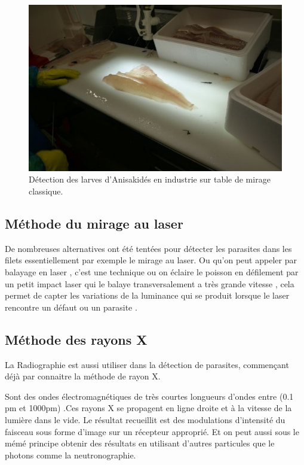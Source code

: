 \documentclass[12pt,a4paper]{article}
\begin{document}
\begin{figure}[!h]
   \center
   \includegraphics[scale=0.5]{Table_mirage.png}
   \caption {Détection des larves d'Anisakidés en industrie sur table de mirage classique.}
\end{figure}

\subsection{Méthode du mirage au laser}

De nombreuses alternatives ont été tentées pour détecter les parasites dans les filets essentiellement  par exemple le mirage au laser.
Ou qu’on peut appeler par balayage en laser , c’est une technique ou on éclaire le poisson en défilement par un petit impact laser  qui le balaye transversalement a très grande vitesse , cela permet de capter les variations de la luminance qui se produit lorsque le laser rencontre un défaut ou un parasite .
\subsection{Méthode des rayons X}
La Radiographie est aussi utiliser dans la détection de parasites, commençant déjà par connaitre la méthode de rayon X.

Sont des ondes électromagnétiques de très courtes longueurs d’ondes entre (0.1 pm et 1000pm) .Ces rayons X se propagent en ligne droite et à la vitesse de la lumière dans le vide.
Le résultat recueillit est des modulations d’intensité du faisceau sous forme d’image sur un récepteur approprié. Et on peut aussi sous le mémé principe obtenir des résultats en utilisant d’autres particules que le photons comme la neutronographie.
\end{document}
